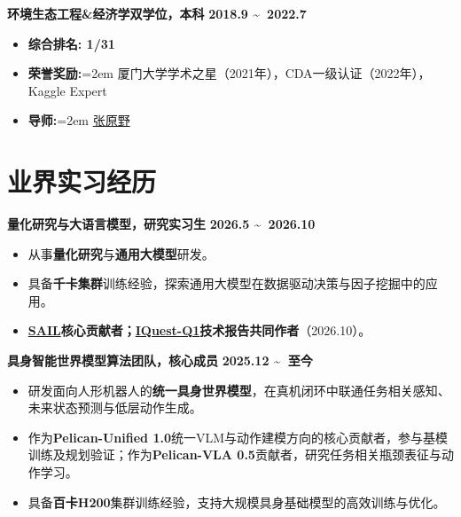 \documentclass{resume}
\begin{document}
\begin{flushleft}
\textbf{\fangsong 环境生态工程\&经济学双学位，本科} \hfill \textbf{2018.9 \textasciitilde\ 2022.7}
\end{flushleft}
\begin{itemize}
    \item \textbf{\kaishu 综合排名: 1/31}
    \item \textbf{\kaishu 荣誉奖励:}\hangindent=2em
    \kaishu 厦门大学学术之星（2021年），CDA一级认证（2022年），Kaggle Expert
    \item \textbf{\kaishu 导师:}\hangindent=2em
    \kaishu \href{https://scholar.google.com/citations?user=l1GMXf4AAAAJ&hl=en&oi=ao}{张原野}
\end{itemize}
\section{\makebox[.75em][c]{\faGroup} \textbf{\fangsong 业界实习经历}}
\begin{flushleft}
\textbf{\fangsong 量化研究与大语言模型，研究实习生} \hfill \textbf{2026.5 \textasciitilde \ 2026.10}
\end{flushleft}
\begin{itemize}
    \item \kaishu 从事\textbf{量化研究}与\textbf{通用大模型}研发。
    \item \kaishu 具备\textbf{千卡集群}训练经验，探索通用大模型在数据驱动决策与因子挖掘中的应用。
    \item \kaishu \textbf{\href{https://arxiv.org/abs/2610.11451}{SAIL}核心贡献者；\href{https://arxiv.org/abs/2610.30949}{IQuest-Q1}技术报告共同作者}（2026.10）。
\end{itemize}

\begin{flushleft}
\textbf{\fangsong 具身智能世界模型算法团队，核心成员} \hfill \textbf{2025.12 \textasciitilde \ 至今}
\end{flushleft}
\begin{itemize}
    \item \kaishu 研发面向人形机器人的\textbf{统一具身世界模型}，在真机闭环中联通任务相关感知、未来状态预测与低层动作生成。
    \item \kaishu 作为\textbf{Pelican-Unified 1.0}统一VLM与动作建模方向的核心贡献者，参与基模训练及规划验证；作为\textbf{Pelican-VLA 0.5}贡献者，研究任务相关瓶颈表征与动作学习。
    \item \kaishu 具备\textbf{百卡H200}集群训练经验，支持大规模具身基础模型的高效训练与优化。
\end{itemize}
\end{document}
